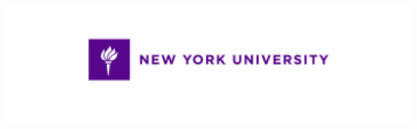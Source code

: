 \documentclass[final]{beamer}
\newlength{\onecolwid}
\begin{document}
\begin{frame}[t]
\begin{columns}[t]
\begin{column}{\onecolwid}
\begin{center}
\includegraphics[width=0.8\linewidth]{nyu_long.png}
\end{center}


\end{column} %

\end{columns} %

\end{frame} %
\end{document}
